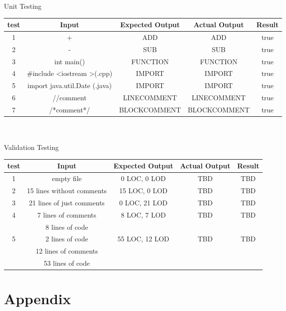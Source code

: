 \documentclass{scrreprt}
\begin{document}
	Unit Testing\\
	\begin{tabular}{|c|c|c|c|c|}
		\hline
		test & Input & Expected Output & Actual Output & Result \\ \hline
		1 & + & ADD & ADD & true\\ \hline
		2 & - & SUB & SUB & true\\ \hline
		3 & int main() & FUNCTION & FUNCTION & true\\ \hline
		4 & \#include \textless iostream \textgreater (.cpp) & IMPORT & IMPORT & true\\ \hline
		5 & import java.util.Date (.java) & IMPORT & IMPORT & true\\ \hline
		6 & //comment & LINECOMMENT & LINECOMMENT & true\\ \hline
		7 & /*comment*/ & BLOCKCOMMENT & BLOCKCOMMENT & true\\ \hline
		
	\end{tabular} \\\\
	
	Validation Testing\\
	\begin{tabular}{|c|c|c|c|c|}
		\hline
		test & Input & Expected Output & Actual Output & Result \\ \hline
		1 & empty file & 0 LOC, 0 LOD & TBD & TBD\\ \hline
		2 & 15 lines without comments & 15 LOC, 0 LOD & TBD & TBD\\ \hline
		3 & 21 lines of just comments & 0 LOC, 21 LOD & TBD & TBD\\ \hline
		4 & 7 lines of comments & 8 LOC, 7 LOD &TBD&TBD\\ & 8 lines of code &&&\\ \hline
		5 &2 lines of code & 55 LOC, 12 LOD & TBD & TBD \\ & 12 lines of comments &&&\\ & 53 lines of code & &&\\ \hline
		
	\end{tabular}

	{\let\clearpage\relax \chapter{Appendix}}
	
\end{document}

